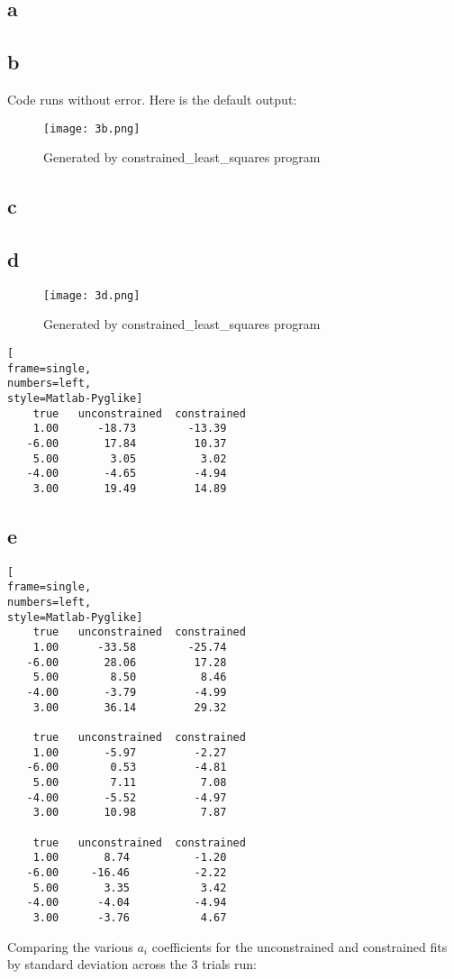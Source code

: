 \documentclass[10pt]{article}
\begin{document}
\subsection{a}

\subsection{b}
Code runs without error. Here is the default output:
\begin{figure}[H]
\centering
\texttt{[image: 3b.png]}
\caption{Generated by constrained\_least\_squares program}
\label{fig:method}
\end{figure}

\subsection{c}



\subsection{d}
\begin{figure}[H]
\centering
\texttt{[image: 3d.png]}
\caption{Generated by constrained\_least\_squares program}
\label{fig:method}
\end{figure}

\begin{lstlisting}[
frame=single,
numbers=left,
style=Matlab-Pyglike]
    true   unconstrained  constrained
    1.00      -18.73        -13.39
   -6.00       17.84         10.37
    5.00        3.05          3.02
   -4.00       -4.65         -4.94
    3.00       19.49         14.89
\end{lstlisting}   

\subsection{e}
\begin{lstlisting}[
frame=single,
numbers=left,
style=Matlab-Pyglike]
    true   unconstrained  constrained
    1.00      -33.58        -25.74
   -6.00       28.06         17.28
    5.00        8.50          8.46
   -4.00       -3.79         -4.99
    3.00       36.14         29.32

    true   unconstrained  constrained
    1.00       -5.97         -2.27
   -6.00        0.53         -4.81
    5.00        7.11          7.08
   -4.00       -5.52         -4.97
    3.00       10.98          7.87

    true   unconstrained  constrained
    1.00       8.74          -1.20
   -6.00     -16.46          -2.22
    5.00       3.35           3.42
   -4.00      -4.04          -4.94
    3.00      -3.76           4.67
\end{lstlisting}   
Comparing the various $a_i$ coefficients for the unconstrained and constrained fits by standard deviation across the 3 trials run:
\end{document}
